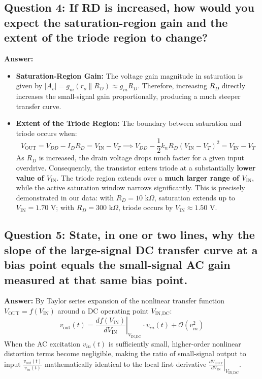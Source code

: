 \documentclass[11pt,a4paper]{article}
\begin{document}
\subsection{Question 4: If RD is increased, how would you expect the saturation-region gain and the extent of the triode region to change?}
\textbf{Answer:}
\begin{itemize}
    \item \textbf{Saturation-Region Gain:} The voltage gain magnitude in saturation is given by $|A_v| = g_m (r_o \parallel R_D) \approx g_m R_D$. Therefore, increasing $R_D$ directly increases the small-signal gain proportionally, producing a much steeper transfer curve.
    \item \textbf{Extent of the Triode Region:} The boundary between saturation and triode occurs when:
    \begin{equation}
        V_{\text{OUT}} = V_{DD} - I_D R_D = V_{\text{IN}} - V_T \implies V_{DD} - \frac{1}{2} k_n R_D (V_{\text{IN}} - V_T)^2 = V_{\text{IN}} - V_T
    \end{equation}
    As $R_D$ is increased, the drain voltage drops much faster for a given input overdrive. Consequently, the transistor enters triode at a substantially \textbf{lower value of $V_{\text{IN}}$}. The triode region extends over a \textbf{much larger range of $V_{\text{IN}}$}, while the active saturation window narrows significantly. This is precisely demonstrated in our data: with $R_D = 10\text{ k}\Omega$, saturation extends up to $V_{\text{IN}} = 1.70\text{ V}$; with $R_D = 300\text{ k}\Omega$, triode occurs by $V_{\text{IN}} \approx 1.50\text{ V}$.
\end{itemize}

\subsection{Question 5: State, in one or two lines, why the slope of the large-signal DC transfer curve at a bias point equals the small-signal AC gain measured at that same bias point.}
\textbf{Answer:}
By Taylor series expansion of the nonlinear transfer function $V_{\text{OUT}} = f(V_{\text{IN}})$ around a DC operating point $V_{\text{IN,DC}}$:
\begin{equation}
    v_{\text{out}}(t) = \left. \frac{df(V_{\text{IN}})}{dV_{\text{IN}}} \right|_{V_{\text{IN,DC}}} \cdot v_{in}(t) + \mathcal{O}(v_{in}^2)
\end{equation}
When the AC excitation $v_{in}(t)$ is sufficiently small, higher-order nonlinear distortion terms become negligible, making the ratio of small-signal output to input $\frac{v_{out}(t)}{v_{in}(t)}$ mathematically identical to the local first derivative $\left. \frac{dV_{\text{OUT}}}{dV_{\text{IN}}} \right|_{V_{\text{IN,DC}}}$.
\end{document}
